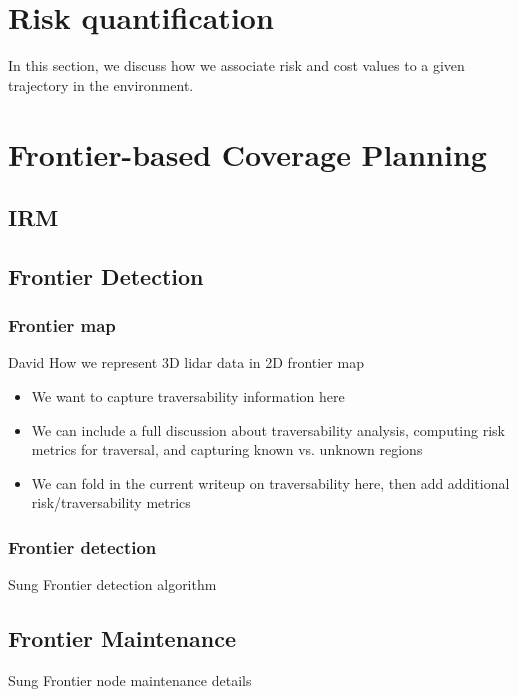 \documentclass[letterpaper, 10 pt, conference]{ieeeconf}  %
\newcommand{\todo}[1]{{\color{red} #1 }} %
\begin{document}
\section{Risk quantification}
In this section, we discuss how we associate risk and cost values to a given trajectory in the environment.

\section{Frontier-based Coverage Planning}

\subsection{IRM}



\subsection{Frontier Detection}

\subsubsection{Frontier map}
\todo{David} How we represent 3D lidar data in 2D frontier map
\begin{itemize}
    \item We want to capture traversability information here
    \item We can include a full discussion about traversability analysis, computing risk metrics for traversal, and capturing known vs. unknown regions
    \item We can fold in the current writeup on traversability here, then add additional risk/traversability metrics
\end{itemize}
\subsubsection{Frontier detection}
\todo{Sung} Frontier detection algorithm


\subsection{Frontier Maintenance}
\todo{Sung} Frontier node maintenance details
\end{document}

